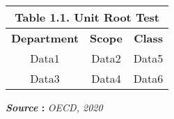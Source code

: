 \documentclass[10pt,a4paper]{article}
\begin{document}
\begin{center}
\begin{tabular}{|c|c|c|}
			\multicolumn{3}{c}{\textbf{Table 1.1. Unit Root Test}} \\
			
			
			\hline
			\textbf{Department} & \textbf{Scope} & \textbf{Class} \\ \cline{1-3}
			\hline
			Data1 & Data2 & Data5 \\ 
			\hline
			Data3 & Data4 & Data6 \\ \hline
		\end{tabular}	
		
		\vspace{0.15cm}	
		
		\textbf{\textit{Source} :} \textit{OECD, 2020} 	
		
		
	\end{center}
	
	\lipsum[1]
	
\end{document}
